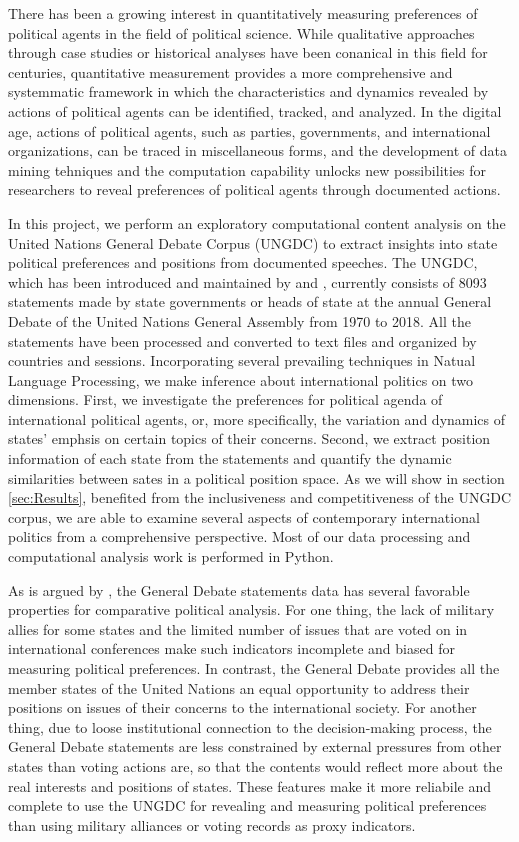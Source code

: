 \documentclass[final,authoryear,3p,12pt,times,hidelinks]{elsarticle}
\begin{document}
There has been a growing interest in quantitatively measuring preferences of political agents in the field of political science. While qualitative approaches through case studies or historical analyses have been conanical in this field for centuries, quantitative measurement provides a more comprehensive and systemmatic framework in which the characteristics and dynamics revealed by actions of political agents can be identified, tracked, and analyzed. In the digital age, actions of political agents, such as parties, governments, and international organizations, can be traced in miscellaneous forms, and the development of data mining tehniques and the computation capability unlocks new possibilities for researchers to reveal preferences of political agents through documented actions. 

In this project, we perform an exploratory computational content analysis on the United Nations General Debate Corpus (UNGDC) to extract insights into state political preferences and positions from documented speeches. The UNGDC, which has been introduced and maintained by \cite{baturo2017understanding} and \cite{DVN/0TJX8Y_2017}, currently consists of 8093 statements made by state governments or heads of state at the annual General Debate of the United Nations General Assembly from 1970 to 2018. All the statements have been processed and converted to text files and organized by countries and sessions. Incorporating several prevailing techniques in Natual Language Processing, we make inference about international politics on two dimensions. First, we investigate the preferences for political agenda of international political agents, or, more specifically, the variation and dynamics of states' emphsis on certain topics of their concerns. Second, we extract position information of each state from the statements and quantify the dynamic similarities between sates in a political position space. As we will show in section \ref{sec:Results}, benefited from the inclusiveness and competitiveness of the UNGDC corpus, we are able to examine several aspects of contemporary international politics from a comprehensive perspective. Most of our data processing and computational analysis work is performed in Python. 

As is argued by \cite{baturo2017understanding}, the General Debate statements data has several favorable properties for comparative political analysis. For one thing, the lack of military allies for some states and the limited number of issues that are voted on in international conferences make such indicators incomplete and biased for measuring political preferences. In contrast, the General Debate provides all the member states of the United Nations an equal opportunity to address their positions on issues of their concerns to the international society. For another thing, due to loose institutional connection to the decision-making process, the General Debate statements are less constrained by external pressures from other states than voting actions are, so that the contents would reflect more about the real interests and positions of states. These features make it more reliabile and complete to use the UNGDC for revealing and measuring political preferences than using military alliances or voting records as proxy indicators. 
\end{document}
